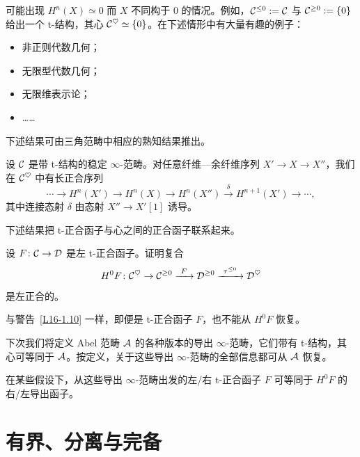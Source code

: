 \begin{warning}\label{L16-2.13}
可能出现 $H^n(X)\simeq0$ 而 $X$ 不同构于 $0$ 的情况。例如，$\mathcal{C}^{\le0}:=\mathcal{C}$ 与 $\mathcal{C}^{\ge0}:=\{0\}$ 给出一个 t-结构，其心 $\mathcal{C}^{\heartsuit}\simeq\{0\}$。在下述情形中有大量有趣的例子：
\begin{itemize}[leftmargin=2.2em,itemsep=0.1em]
\item 非正则代数几何；
\item 无限型代数几何；
\item 无限维表示论；
\item ……
\end{itemize}
\end{warning}

\nitem\label{L16-2.14} 下述结果可由三角范畴中相应的熟知结果推出。

\begin{proposition}\label{L16-2.15}
设 $\mathcal{C}$ 是带 t-结构的稳定 $\infty$-范畴。对任意纤维—余纤维序列 $X'\to X\to X''$，我们在 $\mathcal{C}^{\heartsuit}$ 中有长正合序列
\[
\cdots\to H^n(X')\to H^n(X)\to H^n(X'')\xrightarrow{\ \delta\ }H^{n+1}(X')\to\cdots,
\]
其中连接态射 $\delta$ 由态射 $X''\to X'[1]$ 诱导。
\end{proposition}

\nitem\label{L16-2.16} 下述结果把 t-正合函子与心之间的正合函子联系起来。

\begin{exercise}\label{L16-2.17}
设 $F\colon\mathcal{C}\to\mathcal{D}$ 是左 t-正合函子。证明复合
\[
H^0F\colon \cC^{\heartsuit}\to\cC^{\ge0}\xrightarrow{\ F\ }\cD^{\ge0}\xrightarrow{\ \tau^{\le0}\ }\cD^{\heartsuit}
\]
是左正合的。
\end{exercise}

\begin{warning}\label{L16-2.18}
与警告~\ref{L16-1.10} 一样，即便是 t-正合函子 $F$，也不能从 $H^0F$ 恢复。
\end{warning}

\begin{remark}\label{L16-2.19}
下次我们将定义 Abel 范畴 $\mathcal{A}$ 的各种版本的导出 $\infty$-范畴，它们带有 t-结构，其心可等同于 $\mathcal{A}$。按定义，关于这些导出 $\infty$-范畴的全部信息都可从 $\mathcal{A}$ 恢复。

在某些假设下，从这些导出 $\infty$-范畴出发的左/右 t-正合函子 $F$ 可等同于 $H^0F$ 的右/左导出函子。
\end{remark}

\section{有界、分离与完备}

